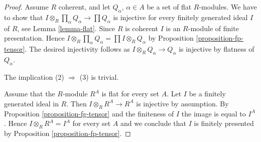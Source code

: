 \documentclass{amsart}
\theoremstyle{plain}
\theoremstyle{definition}
\theoremstyle{remark}
\numberwithin{equation}{subsection}
\begin{document}
\begin{proof}
Assume $R$ coherent, and let $Q_\alpha$, $\alpha \in A$ be a set of flat
$R$-modules. We have to show that
$I \otimes_R \prod_\alpha Q_\alpha \to \prod Q_\alpha$ is injective
for every finitely generated ideal $I$ of $R$, see
Lemma \ref{lemma-flat}.
Since $R$ is coherent $I$ is an $R$-module of finite presentation.
Hence $I \otimes_R \prod_\alpha Q_\alpha = \prod I \otimes_R Q_\alpha$ by
Proposition \ref{proposition-fp-tensor}.
The desired injectivity follows as $I \otimes_R Q_\alpha \to Q_\alpha$
is injective by flatness of $Q_\alpha$.

\medskip\noindent
The implication (2) $\Rightarrow$ (3) is trivial.

\medskip\noindent
Assume that the $R$-module $R^A$ is flat for every set $A$. Let $I$
be a finitely generated ideal in $R$. Then $I \otimes_R R^A \to R^A$
is injective by assumption. By
Proposition \ref{proposition-fg-tensor}
and the finiteness of $I$ the image is equal to $I^A$. Hence
$I \otimes_R R^A = I^A$ for every set $A$ and we conclude that $I$
is finitely presented by
Proposition \ref{proposition-fp-tensor}.
\end{proof}
\end{document}
